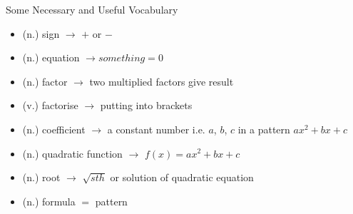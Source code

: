 \documentclass[final]{beamer}
\newlength{\onecolwid}
\begin{document}
\begin{frame}[t]
\begin{columns}[t]
\begin{column}{\onecolwid}
\begin{alertblock}{Some Necessary and Useful Vocabulary}

\begin{itemize}
\item (n.) sign $\rightarrow$ $+$ or $-$
\item (n.) equation $\rightarrow something = 0$ 
\item (n.) factor $\rightarrow$ two multiplied factors give result
\item (v.) factorise $\rightarrow$ putting into brackets
\item (n.) coefficient $\rightarrow$ a constant number i.e. $a$, $b$, $c$ in a pattern $ax^2+bx+c$
\item (n.) quadratic function $\rightarrow$ $f(x) = ax^2+bx+c$
\item (n.) root $\rightarrow$ $\sqrt{sth}$ or solution of quadratic equation
\item (n.) formula $=$ pattern
\end{itemize}

\end{alertblock}



\end{column} %

\end{columns} %

\end{frame} %
\end{document}
